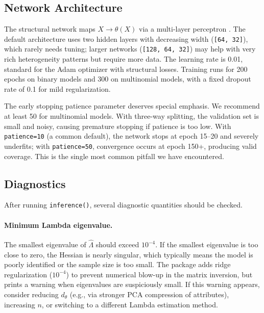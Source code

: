 \subsection{Network Architecture}

The structural network maps $X \to \theta(X)$ via a multi-layer perceptron \citep{hornik1989multilayer}. The default architecture uses two hidden layers with decreasing width (\texttt{[64, 32]}), which rarely needs tuning; larger networks (\texttt{[128, 64, 32]}) may help with very rich heterogeneity patterns but require more data. The learning rate is 0.01, standard for the Adam optimizer with structural losses. Training runs for 200 epochs on binary models and 300 on multinomial models, with a fixed dropout rate of 0.1 for mild regularization.

The early stopping patience parameter deserves special emphasis. We recommend at least 50 for multinomial models. With three-way splitting, the validation set is small and noisy, causing premature stopping if patience is too low. With \texttt{patience=10} (a common default), the network stops at epoch 15--20 and severely underfits; with \texttt{patience=50}, convergence occurs at epoch 150+, producing valid coverage. This is the single most common pitfall we have encountered.

\subsection{Diagnostics}\label{sec:diagnostics}

After running \texttt{inference()}, several diagnostic quantities should be checked.

\paragraph{Minimum Lambda eigenvalue.} The smallest eigenvalue of $\hat{\Lambda}$ should exceed $10^{-4}$. If the smallest eigenvalue is too close to zero, the Hessian is nearly singular, which typically means the model is poorly identified or the sample size is too small. The package adds ridge regularization ($10^{-4}$) to prevent numerical blow-up in the matrix inversion, but prints a warning when eigenvalues are suspiciously small. If this warning appears, consider reducing $d_\theta$ (e.g., via stronger PCA compression of attributes), increasing $n$, or switching to a different Lambda estimation method.

